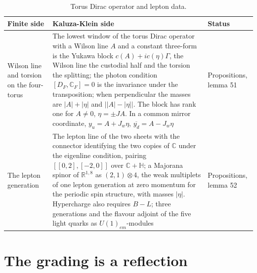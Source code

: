 \documentclass[aps,prd,reprint,onecolumn,nofootinbib,amsmath,amssymb,floatfix]{revtex4-2}
\theoremstyle{plain}
\begin{document}
\begin{table}
\caption{\label{tab:lepton}Torus Dirac operator and lepton data.}
\setlength{\tabcolsep}{0.01\textwidth}
\begin{ruledtabular}
\begin{tabular}{p{}p{}p{}}
Finite side&Kaluza-Klein side&Status\\
\hline
Wilson line and torsion on the four-torus&The lowest window of the torus Dirac operator with a Wilson line $A$ and a constant three-form is the Yukawa block $c(A)+ic(\eta)\Gamma$, the Wilson line the custodial half and the torsion the splitting; the photon condition $[D_F,\mathbb C_F]=0$ is the invariance under the transposition; when perpendicular the masses are $|A|+|\eta|$ and $\big||A|-|\eta|\big|$. The block has rank one for $A\ne0$, $\eta=\pm JA$. In a common mirror coordinate, $y_u=A+J_w\eta$, $\overline{y_d}=A-J_w\eta$&Propositions, lemma 51\\
The lepton generation&The lepton line of the two sheets with the connector identifying the two copies of $\mathbb C$ under the eigenline condition, pairing $[[0,2],[-2,0]]$ over $\mathbb C+\mathbb H$; a Majorana spinor of $\mathbb R^{1,8}$ as $(2,1)\otimes 4$, the weak multiplets of one lepton generation at zero momentum for the periodic spin structure, with masses $|\eta|$. Hypercharge also requires $B-L$; three generations and the flavour adjoint of the five light quarks as $U(1)_{em}$-modules&Propositions, lemma 52\\
\end{tabular}
\end{ruledtabular}
\end{table}

\section{The grading is a reflection}
\end{document}
